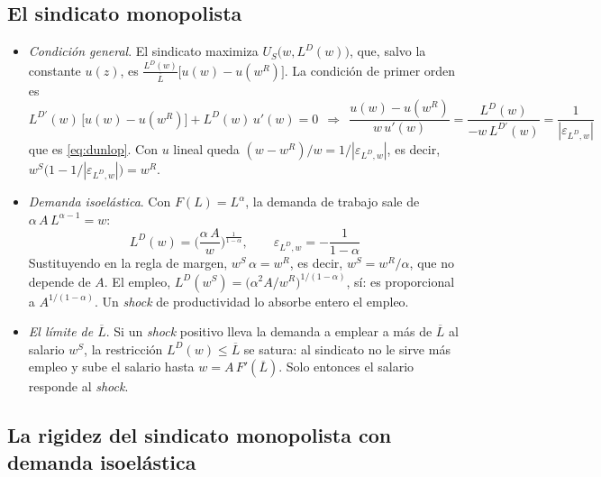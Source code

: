 \documentclass[11pt]{article}
\begin{document}
\subsection{El sindicato monopolista}\label{anexo:dunlop}

\begin{itemize}
\item \emph{Condición general}. El sindicato maximiza $U_S\big(w,L^D(w)\big)$, que, salvo la constante $u(z)$, es $\frac{L^D(w)}{\overline{L}}\big[u(w)-u(w^R)\big]$. La condición de primer orden es
  $$L^{D\prime}(w)\,\big[u(w)-u(w^R)\big]+L^D(w)\,u'(w)=0\ \ \Longrightarrow\ \ \frac{u(w)-u(w^R)}{w\,u'(w)}=\frac{L^D(w)}{-w\,L^{D\prime}(w)}=\frac{1}{|\varepsilon_{L^D,w}|}$$
  que es \eqref{eq:dunlop}. Con $u$ lineal queda $(w-w^R)/w=1/|\varepsilon_{L^D,w}|$, es decir, $w^S\big(1-1/|\varepsilon_{L^D,w}|\big)=w^R$.\findemo
\item \emph{Demanda isoelástica}. Con $F(L)=L^{\alpha}$, la demanda de trabajo sale de $\alpha\,A\,L^{\alpha-1}=w$:
  $$L^D(w)=\Big(\frac{\alpha\,A}{w}\Big)^{\frac{1}{1-\alpha}},\qquad \varepsilon_{L^D,w}=-\frac{1}{1-\alpha}$$
  Sustituyendo en la regla de margen, $w^S\,\alpha=w^R$, es decir, $w^S=w^R/\alpha$, que no depende de $A$. El empleo, $L^D(w^S)=\big(\alpha^2A/w^R\big)^{1/(1-\alpha)}$, sí: es proporcional a $A^{1/(1-\alpha)}$. Un \emph{shock} de productividad lo absorbe entero el empleo.\findemo
\item \emph{El límite de $\overline{L}$}. Si un \emph{shock} positivo lleva la demanda a emplear a más de $\overline{L}$ al salario $w^S$, la restricción $L^D(w)\leq\overline{L}$ se satura: al sindicato no le sirve más empleo y sube el salario hasta $w=A\,F'(\overline{L})$. Solo entonces el salario responde al \emph{shock}.
\end{itemize}

\subsection{La rigidez del sindicato monopolista con demanda isoelástica}\label{anexo:dunlop-rigidez}
\end{document}
